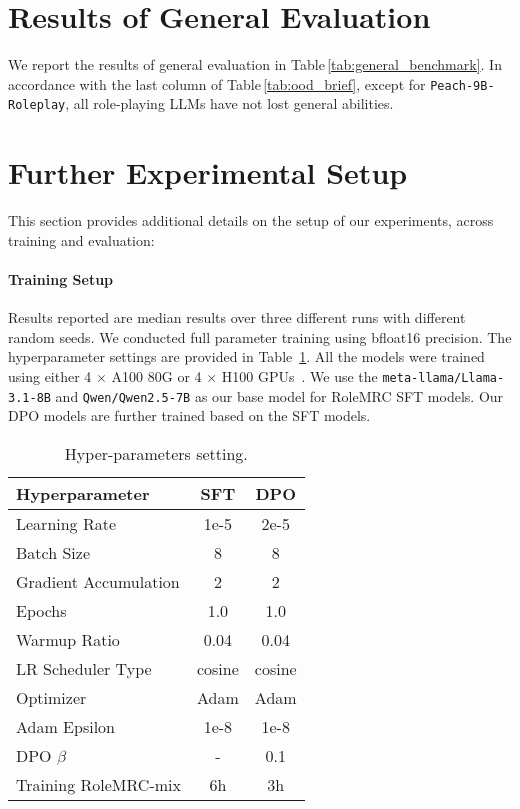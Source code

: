 \section{Results of General Evaluation} 
We report the results of general evaluation in Table\,\ref{tab:general_benchmark}. In accordance with the last column of Table\,\ref{tab:ood_brief}, except for \texttt{Peach-9B-Roleplay}, all role-playing LLMs have not lost general abilities.

\section{Further Experimental Setup} \label{sec:further_experiment_setup}

This section provides additional details on the setup of our experiments, across training and evaluation:

\paragraph{Training Setup} Results reported are median results over three different runs with different random seeds. We conducted full parameter training using bfloat16 precision. The hyperparameter settings are provided in Table~\ref{tab:hyperparameters_generative}. All the models were trained using either 4 $\times$ A100 80G or 4 $\times$ H100 GPUs~\cite{server}. We use the \texttt{meta-llama/Llama-3.1-8B} and \texttt{Qwen/Qwen2.5-7B} as our base model for RoleMRC SFT models. Our DPO models are further trained based on the SFT models.

\begin{table}[ht]
\small
\centering
\begin{tabular}{|l|c|c|}
\hline
\textbf{Hyperparameter} & \textbf{SFT} & \textbf{DPO} \\
\hline
Learning Rate          & 1e-5     & 2e-5        \\
Batch Size             & 8        & 8           \\
Gradient Accumulation  & 2        & 2           \\
Epochs                 & 1.0      & 1.0         \\
Warmup Ratio           & 0.04      & 0.04          \\
LR Scheduler Type      & cosine   & cosine     \\
Optimizer              & Adam     & Adam       \\
Adam Epsilon           & 1e-8     & 1e-8        \\
DPO $\beta$            & -        & 0.1         \\
Training RoleMRC-mix            & 6h        & 3h         \\
\hline
\end{tabular}
\vspace{-2mm}
\caption{Hyper-parameters setting.}
\label{tab:hyperparameters_generative}
\vspace{-5mm}
\end{table}

